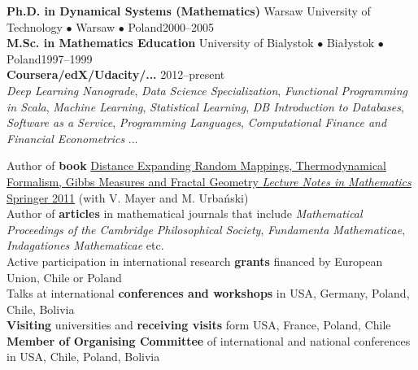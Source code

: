 \documentclass[a4paper, oneside]{scrreprt}
\begin{document}
\noindent\makebox[\linewidth]{\rule{\textwidth}{0.4pt}}

\vspace{0.3cm}

  
\noindent\textbf{Ph.D. in Dynamical Systems (Mathematics)} Warsaw University of Technology $\bullet$ Warsaw $\bullet$ Poland\hfill 2000--2005\\
\noindent\textbf{M.Sc. in Mathematics Education} University of Bialystok $\bullet$ Białystok $\bullet$ Poland\hfill 1997--1999\\
\noindent\textbf{Coursera/edX/Udacity/...} \hfill 2012--present\\
\emph{Deep Learning Nanograde}, \emph{Data Science Specialization}, \emph{Functional Programming in Scala}, 
\emph{Machine Learning},  \emph{Statistical Learning}, 
\emph{DB Introduction to Databases}, \emph{Software as a Service}, 
\emph{Programming Languages}, 
\emph{Computational Finance and Financial Econometrics} ... \\

\noindent\makebox[\linewidth]{\rule{\textwidth}{0.4pt}}

\vspace{0.3cm}


\noindent\llap{\FA \faBook\ \ }Author of \textbf{book} \href{http://www.amazon.com/Distance-Expanding-Thermodynamical-Formalism-Mathematics/dp/3642236499/ref=sr_1_1?s=books&ie=UTF8&qid=1410309067&sr=1-1}{Distance Expanding Random Mappings, Thermodynamical Formalism, Gibbs Measures and Fractal Geometry \textit{Lecture Notes in Mathematics} Springer 2011} (with V. Mayer and M. Urbański)\\
\noindent\llap{\FA \faPencil\ \ }Author of \textbf{articles} in 
mathematical journals that include  
\textit{Mathematical Proceedings of the Cambridge Philosophical Society}, \textit{Fundamenta Mathematicae}, \textit{Indagationes Mathematicae} etc.\\
\noindent\llap{\FA \faFlask\ \ }Active participation in international research \textbf{grants} financed by European Union, Chile or Poland\\
\noindent\llap{\FA \faBullhorn\ \ }Talks at international 
\textbf{conferences and workshops} in USA, Germany, Poland, 
Chile, Bolivia\\
\noindent\llap{\FA \faExchange\ \ }\textbf{Visiting} 
universities and \textbf{receiving visits} form USA, France, Poland, Chile\\
\noindent\llap{\FA \faCalendar\ \ }\textbf{Member of Organising Committee}
of international and national conferences in USA, Chile, Poland, Bolivia
\end{document}
